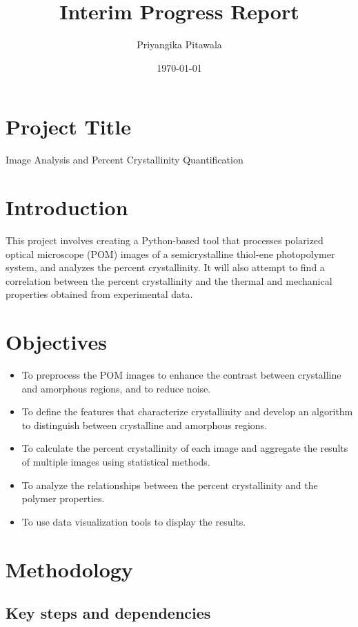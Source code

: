 \documentclass[12pt]{article}
\title{Interim Progress Report}
\author{Priyangika Pitawala}
\date{\today}
\begin{document}
\maketitle

\section*{Project Title}
Image Analysis and Percent Crystallinity Quantification

\section{Introduction}
This project involves creating a Python-based tool that processes polarized optical microscope (POM) images of a semicrystalline
thiol-ene photopolymer system, and analyzes the percent crystallinity. It will also attempt to find a correlation between the percent
crystallinity and the thermal and mechanical properties obtained from experimental data.

\section{Objectives}
\begin{itemize}
    \item To preprocess the POM images to enhance the contrast between crystalline and amorphous regions, and to reduce noise.
    \item To define the features that characterize crystallinity and develop an algorithm to distinguish between crystalline and amorphous regions.
    \item To calculate the percent crystallinity of each image and aggregate the results of multiple images using statistical methods.
    \item To analyze the relationships between the percent crystallinity and the polymer properties.
    \item To use data visualization tools to display the results.
    
\end{itemize}

\section{Methodology}

\subsection{Key steps and dependencies}
\end{document}
